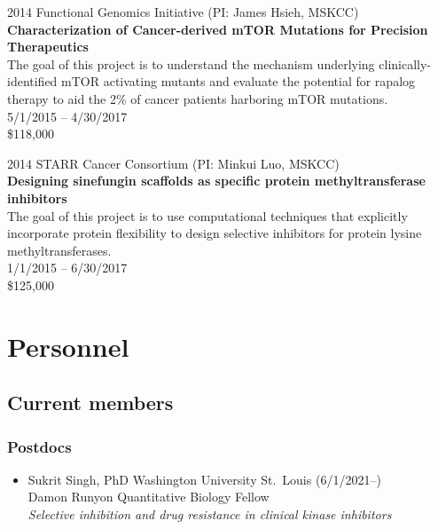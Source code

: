 \documentclass[10pt]{article}
\begin{document}
\vspace{1.5ex}

2014 Functional Genomics Initiative (PI: James Hsieh, MSKCC) \\
{\bf Characterization of Cancer-derived mTOR Mutations for Precision Therapeutics} \\
The goal of this project is to understand the mechanism underlying clinically-identified mTOR activating mutants and evaluate the potential for rapalog therapy to aid the 2\% of cancer patients harboring mTOR mutations. \\
5/1/2015 -- 4/30/2017 \\
\$118,000
\color{black}

\vspace{1.5ex}

2014 STARR Cancer Consortium (PI: Minkui Luo, MSKCC) \\
{\bf Designing sinefungin scaffolds as specific protein methyltransferase inhibitors} \\
The goal of this project is to use computational techniques that explicitly incorporate protein flexibility to design selective inhibitors for protein lysine methyltransferases. \\
1/1/2015 -- 6/30/2017 \\
\$125,000
\color{black}

\eject


\section*{Personnel}

\subsection*{Current members}

\subsubsection*{Postdocs}

\begin{itemize}
  \item Sukrit Singh, PhD Washington University St.\ Louis (6/1/2021--) \\
  Damon Runyon Quantitative Biology Fellow\\
  \emph{Selective inhibition and drug resistance in clinical kinase inhibitors}

\end{itemize}
\end{document}
